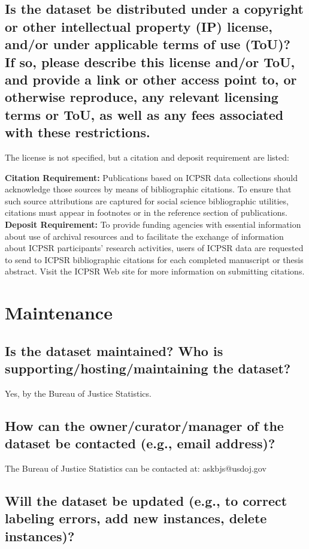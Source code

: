\documentclass[letterpaper, 10 pt, conference]{ieeeconf}  %
\newcommand{\subtitle}[1]{{\\ \small \normalfont \color{purple} #1}}
\begin{document}
\subsection{Is the dataset be distributed under a copyright or other intellectual property (IP) license, and/or under applicable terms of use (ToU)? \subtitle{If so, please describe this license and/or ToU, and provide a link or other access point to, or otherwise reproduce, any relevant licensing terms or ToU, as well as any fees associated with these restrictions.}}

The license is not specified, but a citation and deposit requirement are listed:

\textbf{Citation Requirement:} Publications based on ICPSR data collections should acknowledge those sources by means of bibliographic citations. To ensure that such source attributions are captured for social science bibliographic utilities, citations must appear in footnotes or in the reference section of publications. \\

\textbf{Deposit Requirement:} To provide funding agencies with essential information about use of archival resources and to facilitate the exchange of information about ICPSR participants' research activities, users of ICPSR data are requested to send to ICPSR bibliographic citations for each completed manuscript or thesis abstract. Visit the ICPSR Web site for more information on submitting citations.

\section{Maintenance}

\subsection{Is the dataset maintained? Who is supporting/hosting/maintaining the dataset?}

Yes, by the Bureau of Justice Statistics.


\subsection{How can the owner/curator/manager of the dataset be contacted (e.g., email address)?}

The Bureau of Justice Statistics can be contacted at: askbjs@usdoj.gov


\subsection{Will the dataset be updated (e.g., to correct labeling errors, add new instances, delete instances)?}
\end{document}
